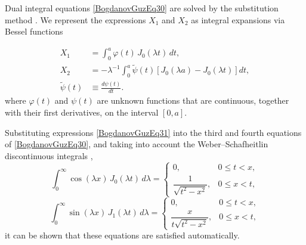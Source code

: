 Dual integral equations \eqref{BogdanovGuzEq30} are solved by the substitution method \cite{BogdanovGuz62}. 
We represent the expressions $X_{1}$ and $X_{2}$ as integral expansions via Bessel functions \cite{BogdanovGuz4}

\begin{align}
	\nonumber
	X_{1} &= \int_{0}^{a} \varphi(t)\,J_{0}(\lambda t)\,dt,
	\\
	\label{BogdanovGuzEq31}
	X_{2} &= -\lambda^{-1}\int_{0}^{a} \tilde{\psi}(t)
	\left[J_{0}(\lambda a)-J_{0}(\lambda t)\right]dt,
	\\
	\nonumber
	\tilde{\psi}(t) &\equiv \frac{d\psi(t)}{dt}.
\end{align}
%
where $\varphi(t)$ and $\psi(t)$ are unknown functions that are continuous, together with their first derivatives, on the interval $[0,a]$.

Substituting expressions \eqref{BogdanovGuzEq31} into the third and fourth equations of \eqref{BogdanovGuzEq30}, and taking into account the Weber--Schafheitlin discontinuous integrals \cite{BogdanovGuz54},
\[
\int_{0}^{\infty}
\cos(\lambda x)\,
J_{0}(\lambda t)\,d\lambda
=
\begin{cases}
	0, & 0\le t<x,\\[6pt]
	\dfrac{1}{\sqrt{t^{2}-x^{2}}}, & 0\le x<t,
\end{cases}
\]
\[
\int_{0}^{\infty}
\sin(\lambda x)\,
J_{1}(\lambda t)\,d\lambda
=
\begin{cases}
	0, & 0\le t<x,\\[6pt]
	\dfrac{x}{t\sqrt{t^{2}-x^{2}}}, & 0\le x<t,
\end{cases}
\]
it can be shown that these equations are satisfied automatically.

